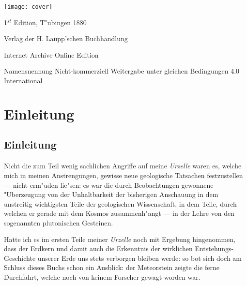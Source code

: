 \documentclass[a4paper, 11pt, oneside]{article}
\begin{document}
\begin{titlepage}
	\texttt{[image: cover]}
	
		
	\vspace*{\fill}%
	
	1$^{st}$ Edition, T"ubingen 1880 %
	
	{\small Verlag der H. Laupp'schen Buchhandlung } %

	\vspace{1\baselineskip} %

    Internet Archive Online Edition  %
	
	{\small Namensnennung Nicht-kommerziell Weitergabe unter gleichen Bedingungen 4.0 International } %
\end{titlepage}
\setlength{\parskip}{1mm plus1mm minus1mm}
\setcounter{tocdepth}{2}
\setcounter{secnumdepth}{3}
\tableofcontents
\clearpage
\listoffigures
\clearpage
\section{Einleitung}
\subsection{Einleitung}
\paragraph{}
Nicht die zum Teil wenig sachlichen Angriffe auf meine \emph{Urzelle} waren es, welche mich in meinen Anstrengungen, gewisse neue geologische Tatsachen festzustellen --- nicht erm"uden lie"sen: es war die durch Beobachtungen gewonnene "Uberzeugung von der Unhaltbarkeit der bisherigen Anschauung in dem unstreitig wichtigsten Teile der geologischen Wissenschaft, in dem Teile, durch welchen er gerade mit dem Kosmos zusammenh"angt --- in der Lehre von den sogenannten plutonischen Gesteinen.

Hatte ich es im ersten Teile meiner \emph{Urzelle} noch mit Ergebung hingenommen, dass der Erdkern und damit auch die Erkenntnis der wirklichen Entstehungs-Geschichte unserer Erde uns stets verborgen bleiben werde: so bot sich doch am Schluss dieses Buchs schon ein Ausblick: der Meteorstein zeigte die ferne Durchfahrt, welche noch von keinem Forscher gewagt worden war.
\end{document}
